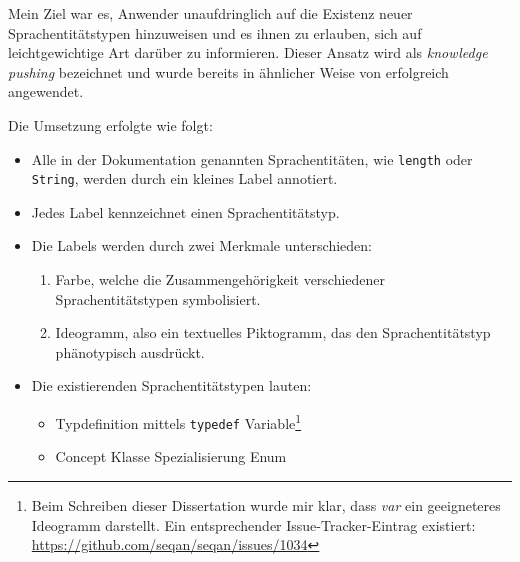 Mein Ziel war es, Anwender unaufdringlich auf die Existenz neuer Sprachentitätstypen hinzuweisen und es ihnen zu erlauben, sich auf leichtgewichtige Art darüber zu informieren. Dieser Ansatz wird als \textit{knowledge pushing} bezeichnet und wurde bereits in ähnlicher Weise von \cite{Watson:2009da,sunshine2014searching} erfolgreich angewendet.

Die Umsetzung erfolgte wie folgt:
\begin{itemize}
  \item Alle in der Dokumentation genannten Sprachentitäten, wie \texttt{length} oder \texttt{String}, werden durch ein kleines Label annotiert.
  \item Jedes Label kennzeichnet einen Sprachentitätstyp.
  \item Die Labels werden durch zwei Merkmale unterschieden:
  \begin{enumerate}
    \item Farbe, welche die Zusammengehörigkeit verschiedener Sprachentitätstypen symbolisiert.
    \item Ideogramm, also ein textuelles Piktogramm, das den Sprachentitätstyp phänotypisch ausdrückt.
  \end{enumerate}
  \item Die existierenden Sprachentitätstypen lauten:
  \begin{itemize}
    \item[]  Typdefinition mittels \texttt{typedef}
    \hspace{1em}  Variable\footnote{Beim Schreiben dieser Dissertation wurde mir klar, dass \textit{var} ein geeigneteres Ideogramm darstellt. Ein entsprechender Issue-Tracker-Eintrag existiert: \url{https://github.com/seqan/seqan/issues/1034}}
    
    \item[]  Concept
    \hspace{1em}  Klasse
    \hspace{1em}  Spezialisierung
    \hspace{1em}  Enum
    

\end{itemize}
\end{itemize}
